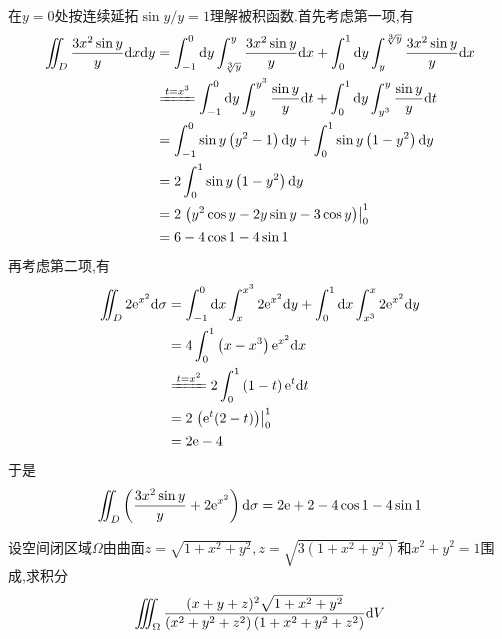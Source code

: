 \documentclass{ctexart}
\begin{document}
\begin{solution}
    在$y=0$处按连续延拓$\sin y/y=1$理解被积函数.首先考虑第一项,有
    \[\begin{aligned}
        \iint_D\dfrac{3x^2\sin y}{y}\di x\di y
        &= \int_{-1}^0\di y\int_{\sqrt[3]y}^{y}\dfrac{3x^2\sin y}{y}\di x+\int_{0}^1\di y\int_{y}^{\sqrt[3]y}\dfrac{3x^2\sin y}{y}\di x \\
        &\xlongequal{t=x^3} \int_{-1}^0\di y\int_y^{y^3}\dfrac{\sin y}{y}\di t+\int_{0}^1\di y\int_{y^3}^{y}\dfrac{\sin y}{y}\di t\\
        &= \int_{-1}^0\sin y\left(y^2-1\right)\di y+\int_{0}^1\sin y\left(1-y^2\right)\di y\\
        &= 2\int_{0}^1\sin y\left(1-y^2\right)\di y \\
        &= 2\left.\left(y^2\cos y-2y\sin y-3\cos y\right)\right|_0^1 \\
        &= 6-4\cos 1-4\sin 1
    \end{aligned}\]
    再考虑第二项,有
    \[\begin{aligned}
        \iint_D2\e^{x^2}\di\sigma
        &= \int_{-1}^0\dx\int_{x}^{x^3}2\e^{x^2}\di y+\int_{0}^1\dx\int_{x^3}^{x}2\e^{x^2}\di y \\
        &= 4\int_{0}^1\left(x-x^3\right)\e^{x^2}\dx \\
        &\xlongequal{t=x^2}2\int_0^1\left(1-t\right)\e^t\di t \\
        &= 2\left.\left(\e^t(2-t)\right)\right|_0^1 \\
        &= 2\e-4
    \end{aligned}\]
    于是
    \[\iint_D\left(\dfrac{3x^2\sin y}{y}+2\mathrm{e}^{x^2}\right)\mathrm{d}\sigma=2\mathrm{e}+2-4\cos 1-4\sin 1\]

\end{solution}
\begin{problem}[8.(10\songti{分})]
    设空间闭区域$\Omega$由曲面$z=\sqrt{1+x^2+y^2},z=\sqrt{3\left(1+x^2+y^2\right)}$和$x^2+y^2=1$围成,求积分
    \[\iiint_{\Omega}\dfrac{(x+y+z)^2\sqrt{1+x^2+y^2}}{\left(x^2+y^2+z^2\right)\left(1+x^2+y^2+z^2\right)}\mathrm{d} V\]

\end{problem}
\end{document}
